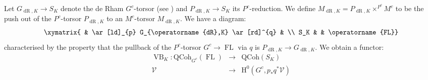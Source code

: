 \documentclass[10pt, oneside]{amsart}
\numberwithin{equation}{subsection}
\theoremstyle{definition}
\theoremstyle{remark}
\newcommand{\opn}[1]{\operatorname{#1}}
\begin{document}
Let $G_{\opn{dR},K} \rightarrow S_K$ denote the de Rham $G^c$-torsor (see \cite[\S III.3]{MR1044823}) and $P_{\opn{dR}, K} \rightarrow S_K$ its $P^c$-reduction. We define $M_{\opn{dR}, K} = P_{\opn{dR}, K} \times^{P^c} M^c$ to be the push out of the $P^c$-torsor $P_{\opn{dR}, K}$ to an $M^c$-torsor $M_{\opn{dR}, K}$. We have a diagram: 
\begin{eqnarray*}
\xymatrix{ & \ar[ld]_{p} G_{\opn{dR},K} \ar[rd]^{q} &  \\
S_K & & \opn{FL}}
\end{eqnarray*}
characterised by the property that the pullback of the $P^c$-torsor $G^c \rightarrow \opn{FL}$ via $q$ is $P_{\opn{dR}, K} \rightarrow G_{\opn{dR}, K}$. 
We obtain a functor: 
\begin{eqnarray*}
\opn{VB}_K \colon \mathrm{QCoh}_{G^c}(\opn{FL}) & \rightarrow & \mathrm{QCoh}(S_K) \\
\mathcal{V} & \rightarrow & \mathrm{H}^0(G^c, p_* q^* \mathcal{V})
\end{eqnarray*}
\end{document}
